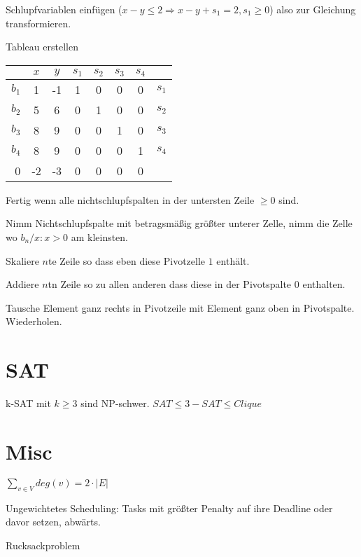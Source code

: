 \documentclass[10pt,a4paper]{article}
\newenvironment{packed_enum}{
\begin{enumerate}
  \setlength{\itemsep}{1pt}
  \setlength{\parskip}{0pt}
  \setlength{\parsep}{0pt}
}{\end{enumerate}}
\begin{document}
\begin{packed_enum}
\item Schlupfvariablen einfügen ($x-y \leq 2 \Rightarrow x-y+s_1 = 2, s_1\geq 0$) also zur Gleichung transformieren.
\item Tableau erstellen
\begin{tabular}{ r | c c c c c c | l }
    & $x$ & $y$ & $s_1$ & $s_2$ & $s_3$ & $s_4$ \\
    \hline
  $b_1$ & 1 & -1 &1&0&0&0 &$s_1$ \\
  $b_2$ & 5 & 6 &0&1&0&0 &$s_2$\\
  $b_3$ & 8 & 9 &0&0&1&0 &$s_3$\\
  $b_4$ & 8 & 9 &0&0&0&1 &$s_4$\\
  \hline
      0 & -2 & -3 &0&0&0&0\\
\end{tabular}
\item Fertig wenn alle nichtschlupfspalten in der untersten Zeile $\geq 0$ sind.
\item Nimm Nichtschlupfspalte mit betragsmäßig größter unterer Zelle, nimm die Zelle wo $b_n/x : x > 0$ am kleinsten.
\item Skaliere $n$te Zeile so dass eben diese Pivotzelle $1$ enthält.
\item Addiere $n$tn Zeile so zu allen anderen dass diese in der Pivotspalte $0$ enthalten.
\item Tausche Element ganz rechts in Pivotzeile mit Element ganz oben in Pivotspalte. Wiederholen.
\end{packed_enum}
\section{SAT}
k-SAT mit $k \geq 3$ sind NP-schwer.
$SAT \leq 3-SAT \leq Clique$
\section{Misc}
$\sum\limits_{v \in V} deg(v) = 2 \cdot |E|$

Ungewichtetes Scheduling: Tasks mit größter Penalty auf ihre Deadline oder davor setzen, abwärts.

Rucksackproblem
\end{document}

